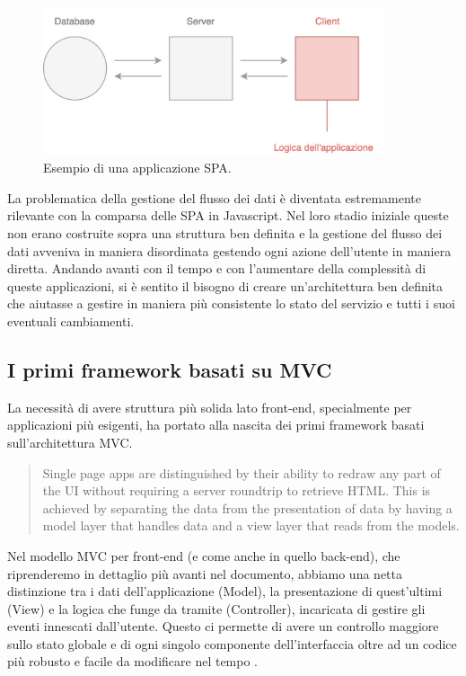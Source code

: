 \begin{figure}[h]
\centering
\includegraphics[width=10cm]{./images/yesSPA} 
\caption{Esempio di una applicazione SPA.}
\label{yesSPA}
\end{figure}

\noindent
La problematica della gestione del flusso dei dati è diventata estremamente rilevante con la comparsa delle SPA in Javascript. Nel loro stadio iniziale queste non erano costruite sopra una struttura ben definita e la gestione del flusso dei dati avveniva in maniera disordinata gestendo ogni azione dell'utente in maniera diretta.
Andando avanti con il tempo e con l'aumentare della complessità di queste applicazioni, si è sentito il bisogno di creare un'architettura ben definita che aiutasse a gestire in maniera più consistente lo stato del servizio e tutti i suoi eventuali cambiamenti.

\subsection{I primi framework basati su MVC}
La necessità di avere struttura più solida lato front-end, specialmente per applicazioni più esigenti, ha portato alla nascita dei primi framework basati sull'architettura MVC.

\blockquote{Single page apps are distinguished by their ability to redraw any part of the UI without requiring a server roundtrip to retrieve HTML. This is achieved by separating the data from the presentation of data by having a model layer that handles data and a view layer that reads from the models. \cite{MixuSinglePageWebApp}}

\noindent Nel modello MVC per front-end (e come anche in quello back-end), che riprenderemo in dettaglio più avanti nel documento, abbiamo una netta distinzione tra i dati dell'applicazione (Model), la presentazione di quest'ultimi (View) e la logica che funge da tramite (Controller), incaricata di gestire gli eventi innescati dall'utente. Questo ci permette di avere un controllo maggiore sullo stato globale e di ogni singolo componente dell'interfaccia oltre ad un codice più robusto e facile da modificare nel tempo \cite{ParrOnTheMVC}.

